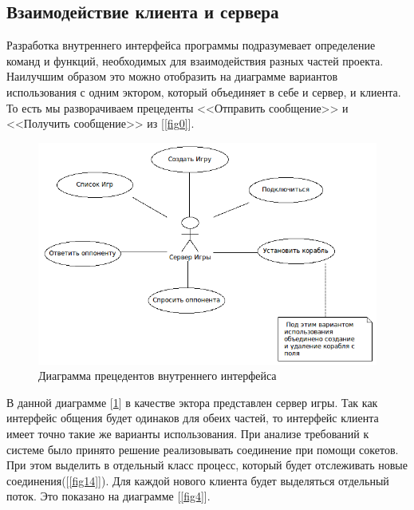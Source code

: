﻿\subsection{Взаимодействие клиента и сервера}
  Разработка внутреннего интерфейса программы подразумевает определение команд и функций, необходимых для взаимодействия разных частей проекта. Наилучшим образом это можно отобразить на диаграмме вариантов использования с одним эктором, который объединяет в себе и сервер, и клиента. То есть мы разворачиваем прецеденты <<Отправить сообщение>> и <<Получить сообщение>> из [\ref{fig0}].  

\begin{figure}[ht]
\centering
\includegraphics[width=15cm]{images/interface.png}
\caption{Диаграмма прецедентов внутреннего интерфейса}
\label{fig3}
\end{figure}

В данной диаграмме [\ref{fig3}] в качестве эктора представлен сервер игры. Так как интерфейс общения будет одинаков для обеих частей, то интерфейс клиента имеет точно такие же варианты использования. При анализе требований к системе было принято решение реализовывать соединение при помощи сокетов. При этом выделить в отдельный класс процесс, который будет отслеживать новые соединения([\ref{fig14}]). Для каждой нового клиента будет выделяться отдельный поток. Это показано на диаграмме [\ref{fig4}].

